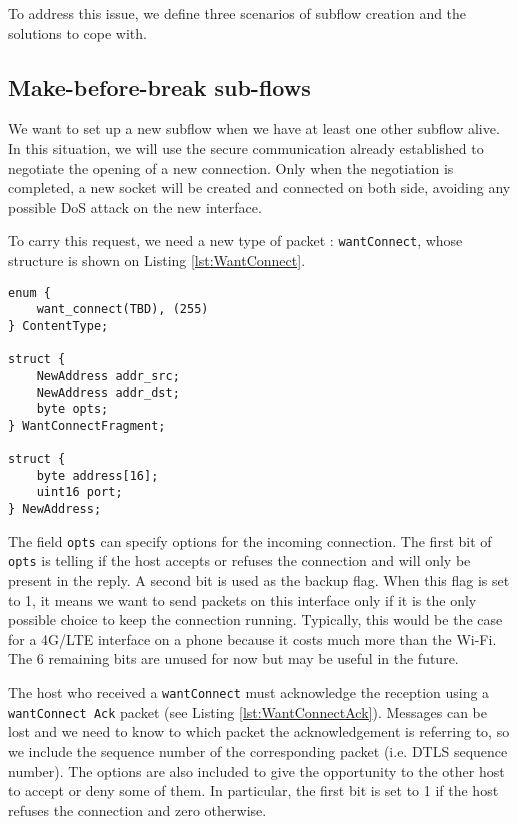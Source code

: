 To address this issue, we define three scenarios of subflow creation and the solutions to cope with.

\subsection{Make-before-break sub-flows}
\label{sec:mbf}

We want to set up a new subflow when we have at least one other subflow alive. In this situation, we will use the secure communication already established to negotiate the opening of a new connection. Only when the negotiation is completed, a new socket will be created and connected on both side, avoiding any possible DoS attack on the new interface.

To carry this request, we need a new type of packet : \texttt{wantConnect}, whose structure is shown on Listing \ref{lst:WantConnect}.

\begin{lstlisting}[caption= WantConnect message, label=lst:WantConnect]
enum {
    want_connect(TBD), (255)
} ContentType;

struct {
    NewAddress addr_src;
    NewAddress addr_dst;
    byte opts;
} WantConnectFragment;

struct {
    byte address[16];
    uint16 port;
} NewAddress;
\end{lstlisting}

The field \texttt{opts} can specify options for the incoming connection. The first bit of \texttt{opts} is telling if the host accepts or refuses the connection and will only be present in the reply. A second bit is used as the backup flag. When this flag is set to 1, it means we want to send packets on this interface only if it is the only possible choice to keep the connection running. Typically, this would be the case for a 4G/LTE interface on a phone because it costs much more than the Wi-Fi. The 6 remaining bits are unused for now but may be useful in the future.

The host who received a \texttt{wantConnect} must acknowledge the reception using a \texttt{wantConnect Ack} packet (see Listing \ref{lst:WantConnectAck}). Messages can be lost and we need to know to which packet the acknowledgement is referring to, so we include the sequence number of the corresponding packet (i.e. DTLS sequence number). The options are also included to give the opportunity to the other host to accept or deny some of them. In particular, the first bit is set to 1 if the host refuses the connection and zero otherwise.

